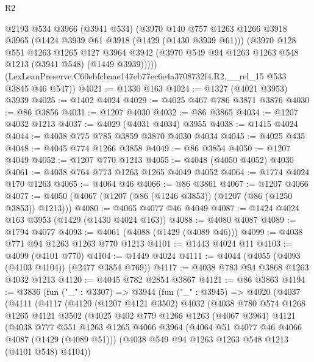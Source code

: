 \begin{lexlean}{R2}
\begin{coremodule}
        @2193
        @534
        @3966
        (@3941 @534)
        (@3970
          @140
          @757
          @1263
          @1266
          @3918
          @3965
          (@1424 @3939 @61 @3918 (@1429 (@1430 @3939 @61)))
          (@3970
            @128
            @551
            @1263
            @1265
            @127
            @3964
            @3942
            (@3970 @549 @94 @1263 @1263 @548 @1213 (@3941 @548) (@1449 @3939)))))
      (LexLeanPreserve.C60ebfcbaae147eb77ec6e4a3708732f4.R2.__rel_15 @533 @3845 @46 @547))
@4021 := @1330 @163
@4024 := @1327 (@4021 @3953) @3939
@4025 := @1402 @4024
@4029 := @4025 @467 @786 @3871 @3876
@4030 := @86 @3856
@4031 := @1207 @4030
@4032 := @86 @3865
@4034 := @1207 @4032 @1213
@4037 := @4029 (@4031 @4034) @3955
@4038 := @1415 @4024
@4044 := @4038 @775 @785 @3859 @3870 @4030 @4034
@4045 := @4025 @435
@4048 := @4045 @774 @1266 @3858
@4049 := @86 @3854
@4050 := @1207 @4049
@4052 := @1207 @770 @1213
@4055 := @4048 (@4050 @4052) @4030
@4061 := @4038 @764 @773 @1263 @1265 @4049 @4052
@4064 := @1774 @4024 @170 @1263
@4065 := @4064 @46
@4066 := @86 @3861
@4067 := @1207 @4066
@4077 := @4050 (@4067 (@1207 (@86 (@1246 @3853)) (@1207 (@86 (@1250 @3853)) @1213)))
@4080 := @4065 @4077 @46 @4049
@4087 := @1424 @4024 @163 @3953 (@1429 (@1430 @4024 @163))
@4088 := @4080 @4087
@4089 := @1794 @4077
@4093 := @4061 (@4088 (@1429 (@4089 @46)))
@4099 := @4038 @771 @94 @1263 @1263 @770 @1213
@4101 := @1443 @4024 @11
@4103 := @4099 (@4101 @770)
@4104 := @1449 @4024
@4111 := @4044 (@4055 (@4093 (@4103 @4104)) (@2477 @3854 @769))
@4117 := @4038 @783 @94 @3868 @1263 @4032 @1213
@4120 := @4045 @782 @2854 @3867
@4121 := @86 @3863
@4194 := @3836
    (fun ("_" : @3307) =>
    @3944
      (fun ("_" : @3945) =>
      @4020
        (@4037
          (@4111
            (@4117
              (@4120
                (@1207 @4121 @3502)
                @4032
                (@4038
                  @780
                  @574
                  @1268
                  @1265
                  @4121
                  @3502
                  (@4025
                    @402
                    @779
                    @1266
                    @1263
                    (@4067 @3964)
                    @4121
                    (@4038
                      @777
                      @551
                      @1263
                      @1265
                      @4066
                      @3964
                      (@4064 @51 @4077 @46 @4066 @4087 (@1429 (@4089 @51)))
                      (@4038 @549 @94 @1263 @1263 @548 @1213 (@4101 @548) @4104))

\end{coremodule}
\end{lexlean}
